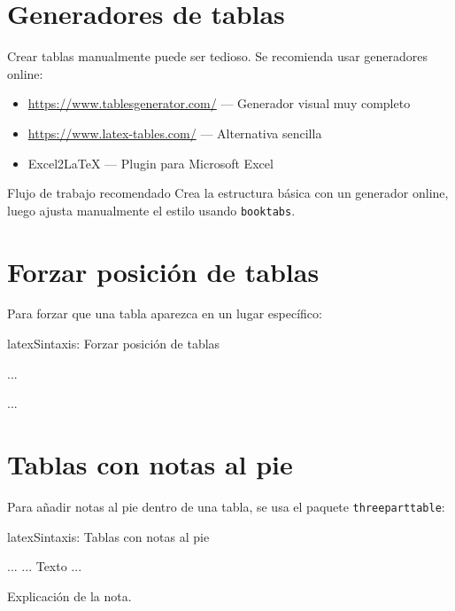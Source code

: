 \section{Generadores de tablas}
\label{sec:generadores-tablas}

Crear tablas manualmente puede ser tedioso. Se recomienda usar generadores online:

\begin{itemize}
  \item \url{https://www.tablesgenerator.com/} --- Generador visual muy completo
  \item \url{https://www.latex-tables.com/} --- Alternativa sencilla
  \item Excel2LaTeX --- Plugin para Microsoft Excel
\end{itemize}

\begin{tipbox}{Flujo de trabajo recomendado}
Crea la estructura básica con un generador online, luego ajusta manualmente el estilo usando \texttt{booktabs}.
\end{tipbox}

\section{Forzar posición de tablas}
\label{sec:forzar-posicion}

Para forzar que una tabla aparezca en un lugar específico:

\begin{codigosimple}{latex}{Sintaxis: Forzar posición de tablas}
\begin{table}[htbp]
  ...
\end{table}

\begin{table}[htbp]
  ...
\end{table}
\FloatBarrier  %
\end{codigosimple}

\section{Tablas con notas al pie}
\label{sec:tablas-notas}

Para añadir notas al pie dentro de una tabla, se usa el paquete \texttt{threeparttable}:

\begin{codigosimple}{latex}{Sintaxis: Tablas con notas al pie}
\begin{threeparttable}
  \begin{tabular}{...}
    ... Texto ...
  \end{tabular}
  \begin{tablenotes}
    \item[a] Explicación de la nota.
  \end{tablenotes}
\end{threeparttable}
\end{codigosimple}

